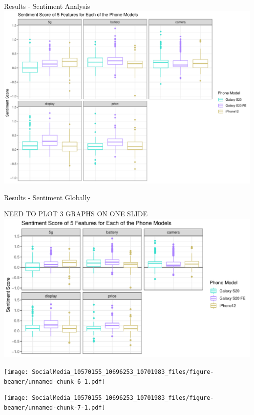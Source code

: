 \documentclass[
  ignorenonframetext,
]{beamer}
\begin{document}
\begin{frame}{Results - Sentiment Analysis}
\protect\hypertarget{results---sentiment-analysis}{}
\includegraphics{SocialMedia_10570155_10696253_10701983_files/figure-beamer/unnamed-chunk-3-1.pdf}
\end{frame}

\begin{frame}{Results - Sentiment Globally}
\protect\hypertarget{results---sentiment-globally}{}
\begin{block}{NEED TO PLOT 3 GRAPHS ON ONE SLIDE}
\protect\hypertarget{need-to-plot-3-graphs-on-one-slide}{}
\includegraphics{SocialMedia_10570155_10696253_10701983_files/figure-beamer/unnamed-chunk-5-1.pdf}

\texttt{[image: SocialMedia\_10570155\_10696253\_10701983\_files/figure-beamer/unnamed-chunk-6-1.pdf]}

\texttt{[image: SocialMedia\_10570155\_10696253\_10701983\_files/figure-beamer/unnamed-chunk-7-1.pdf]}
\end{block}
\end{frame}
\end{document}
